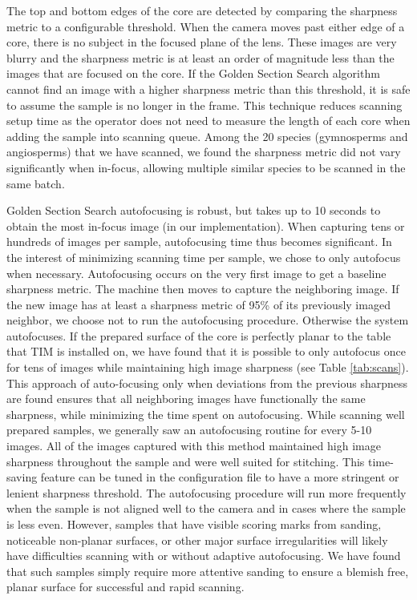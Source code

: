 \documentclass[a4paper,12pt]{article}
\newcommand{\R}[1]{\label{#1}\linelabel{#1}}
\begin{document}
The top and bottom edges of the core are detected by comparing the sharpness metric to a configurable threshold.
When the camera moves past either edge of a core, there is no subject in the focused plane of the lens. These images are very blurry and the sharpness metric is at least an order of magnitude less than the images that are focused on the core. 
If the Golden Section Search algorithm cannot find an image with a higher sharpness metric than this threshold, it is safe to assume the sample is no longer in the frame. This technique reduces scanning setup time as the operator does not need to measure the length of each core when adding the sample into scanning queue.
\R{line_change_4}Among the 20 species (gymnosperms and angiosperms) that we have scanned, we found the sharpness metric did not vary significantly when in-focus, allowing multiple similar species to be scanned in the same batch.

Golden Section Search autofocusing is robust, but takes up to 10 seconds to obtain the most in-focus image (in our implementation). When capturing tens or hundreds of images per sample, autofocusing time thus becomes significant.
In the interest of minimizing scanning time per sample, we chose to only autofocus when necessary. Autofocusing occurs on the very first image to get a baseline sharpness metric. The machine then moves to capture the neighboring image.
\R{skip_rule}If the new image has at least a sharpness metric of 95\% of its previously imaged neighbor, we choose not to run the autofocusing procedure. Otherwise the system autofocuses. If the prepared surface of the core is perfectly planar to the table that TIM is installed on, we have found that it is possible to only autofocus once for tens of images while maintaining high image sharpness (see Table \ref{tab:scans}).
\R{autofocusing_1}This approach of auto-focusing only when deviations from the previous sharpness are found ensures that all neighboring images have functionally the same sharpness, while minimizing the time spent on autofocusing. 
While scanning well prepared samples, we generally saw an autofocusing routine for every 5-10 images. All of the images captured with this method maintained high image sharpness throughout the sample and were well suited for stitching. 
This time-saving feature can be tuned in the configuration file to have a more stringent or lenient sharpness threshold. 
The autofocusing procedure will run more frequently when the sample is not aligned well to the camera and in cases where the sample is less even. However, samples that have visible scoring marks from sanding, noticeable non-planar surfaces, or other major surface irregularities will likely have difficulties scanning with or without adaptive autofocusing. We have found that such samples simply require more attentive sanding to ensure a blemish free, planar surface for successful and rapid scanning.\R{autofocusing_2} %
\end{document}
